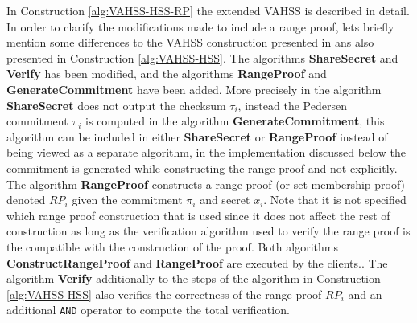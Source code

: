 In Construction \ref{alg:VAHSS-HSS-RP} the extended VAHSS is described in detail. In order to clarify the modifications made to include a range proof, lets briefly mention some differences to the VAHSS construction presented in \cite{SumItUp} ans also presented in Construction \ref{alg:VAHSS-HSS}. The algorithms \textbf{ShareSecret} and \textbf{Verify} has been modified,  and the algorithms \textbf{RangeProof} and \textbf{GenerateCommitment} have been added. More precisely in the algorithm \textbf{ShareSecret} does not output the checksum $\tau_i$, instead the Pedersen commitment $\pi_i$ is computed in the algorithm \textbf{GenerateCommitment}, this algorithm can be included in either \textbf{ShareSecret}  or \textbf{RangeProof} instead of being viewed as a separate algorithm, in the implementation discussed below the commitment is generated while constructing the range proof and not explicitly. The algorithm \textbf{RangeProof} constructs a range proof (or set membership proof) denoted $RP_i$ given the commitment $\pi_i$ and secret $x_i$. Note that it is not specified which range proof construction that is used since it does not affect the rest of construction as long as the verification algorithm used to verify the range proof is the compatible with the construction of the proof. Both algorithms \textbf{ConstructRangeProof} and \textbf{RangeProof} are executed by the clients.. The algorithm \textbf{Verify} additionally to the steps of the algorithm in Construction \ref{alg:VAHSS-HSS} also verifies the correctness of the range proof $RP_i$ and an additional \texttt{AND} operator to compute the total verification. 



